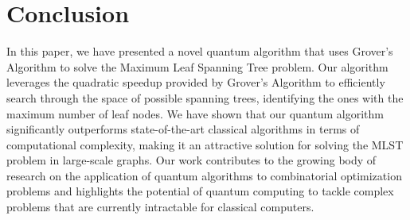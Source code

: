 \section{Conclusion} \label{sec:conclusion}
In this paper, we have presented a novel quantum algorithm that uses Grover's Algorithm to solve the Maximum Leaf Spanning Tree problem. Our algorithm leverages the quadratic speedup provided by Grover's Algorithm to efficiently search through the space of possible spanning trees, identifying the ones with the maximum number of leaf nodes. We have shown that our quantum algorithm significantly outperforms state-of-the-art classical algorithms in terms of computational complexity, making it an attractive solution for solving the MLST problem in large-scale graphs. Our work contributes to the growing body of research on the application of quantum algorithms to combinatorial optimization problems and highlights the potential of quantum computing to tackle complex problems that are currently intractable for classical computers.

